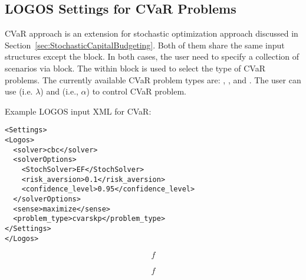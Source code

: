 \subsection{LOGOS Settings for CVaR Problems}
\label{subsec:CVaRSettings}
CVaR approach is an extension for stochastic optimization approach discussed in
Section~\ref{sec:StochasticCapitalBudgeting}. Both of them share the same input
structures except the  block. In both cases, the user need to
specify a collection of scenarios via  block. The
 within  block is used to select the
type of CVaR problems. The currently available CVaR problem types are:
, , and . The user can
use  (i.e. $\lambda$) and 
(i.e., $\alpha$) to control CVaR problem.

Example LOGOS input XML for CVaR:
\begin{lstlisting}[style=XML]
<Settings>
<Logos>
  <solver>cbc</solver>
  <solverOptions>
    <StochSolver>EF</StochSolver>
    <risk_aversion>0.1</risk_aversion>
    <confidence_level>0.95</confidence_level>
  </solverOptions>
  <sense>maximize</sense>
  <problem_type>cvarskp</problem_type>
</Settings>
</Logos>
\end{lstlisting}




\begin{equation}
f
\end{equation}

\begin{subequations}\label{WassersteinConstraints}
\begin{eqnarray}
f
\end{eqnarray}
\end{subequations}

